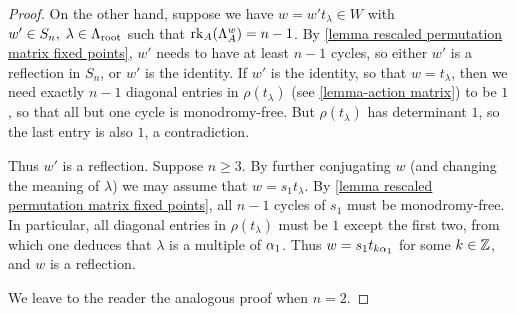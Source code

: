 \begin{proof}
    
    On the other hand, suppose we have $w=w't_{\lambda} \in W$ with $w'\in S_n, \; \lambda \in \Lambda_{\operatorname{root}}$ such that  $\operatorname{rk}_A(\Lambda_A^w)=n-1$.
    By \cref{lemma rescaled permutation matrix fixed points}, $w'$ needs to have at least $n-1$ cycles, so either $w'$ is a reflection in $S_n$, or $w'$ is the identity. If $w'$ is the identity, so that $w = t_{\lambda}$, then we need exactly $n-1$ diagonal entries in $\rho(t_{\lambda})$ (see \cref{lemma-action matrix}) to be $1$, so that all but one cycle is monodromy-free. But $\rho(t_{\lambda})$ has determinant $1$, so the last entry is also $1$, a contradiction.
    
     Thus $w'$ is a reflection. Suppose $n \ge 3$. By further conjugating $w$ (and changing the meaning of $\lambda$) we may assume that $w = s_1 t_{\lambda}$. By \cref{lemma rescaled permutation matrix fixed points}, all $n-1$ cycles of $s_1$ must be monodromy-free. In particular, all diagonal entries in $\rho(t_{\lambda})$ must be $1$ except the first two, from which one deduces that $\lambda$ is a multiple of $\alpha_1$.  Thus $w = s_1 t_{k \alpha_1}$ for some $k \in \mathbb{Z}$, and $w$ is a reflection. 

    We leave to the reader the analogous proof when $n=2$.


\end{proof}
